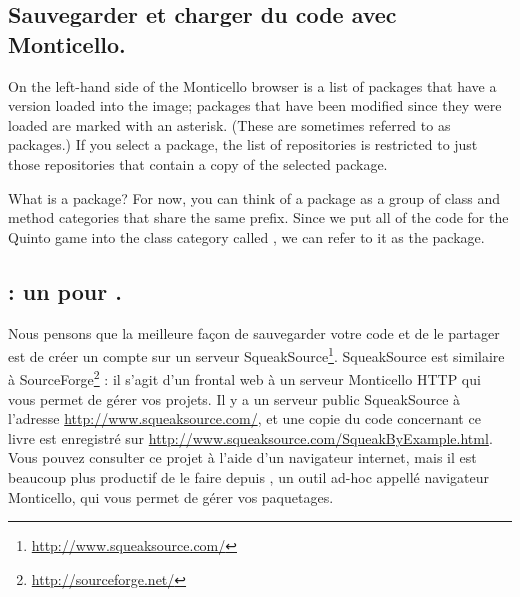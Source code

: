 \documentclass[a4paper,10pt,twoside]{book}
\begin{document}
\subsection{Sauvegarder et charger du code avec Monticello.}
On the left-hand side of the Monticello browser is a list of packages that have a version loaded into the image; packages that have been modified since they were loaded are marked with an asterisk.  (These are sometimes referred to as  packages.)  If you select a package, the list of repositories is restricted to just those repositories that contain a copy of the selected package.

What is a package?  For now, you can think of a package as a group of  class and method categories that share the same prefix.  Since we put all of the code for the Quinto game into the class category called , we can refer to it as the  package.


\subsection{: un  pour \squeak.} 
Nous pensons que la meilleure façon de sauvegarder votre code et de le partager est de créer un compte sur un serveur SqueakSource\footnote{\url{http://www.squeaksource.com/}}.
SqueakSource est similaire à SourceForge\footnote{\url{http://sourceforge.net/}} : il s'agit d'un frontal web à un serveur Monticello HTTP qui vous permet de gérer vos projets.
Il y a un serveur public SqueakSource à l'adresse \url{http://www.squeaksource.com/}, et une copie du code concernant ce livre est enregistré sur \url{http://www.squeaksource.com/SqueakByExample.html}. Vous pouvez consulter ce projet à l'aide d'un navigateur internet, mais il est beaucoup plus productif de le faire depuis \squeak, un outil ad-hoc appellé navigateur Monticello, qui vous permet de gérer vos paquetages.
\end{document}
